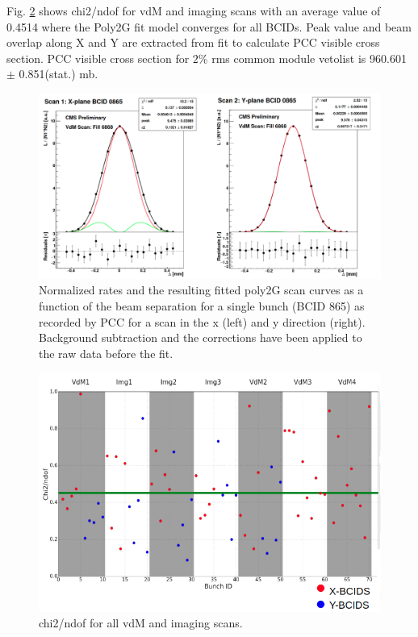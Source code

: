 Fig. \ref{fig:fitquality} shows chi2/ndof for vdM and imaging scans with an average value of 0.4514 where the Poly2G fit model converges for all BCIDs. Peak value and beam overlap along X and Y are extracted from fit to calculate PCC visible cross section. PCC visible cross section for $2\%$ rms common module vetolist is 960.601 $\pm$ 0.851(stat.) mb.

\begin{figure}[h]
    \centering
    \includegraphics[width=1\textwidth]{ashish_thesis/vdM_fit_cveto.png}
    \caption[PCC rate fit]{Normalized rates and the resulting fitted poly2G scan curves as a function of the beam separation for a single bunch (BCID 865) as recorded by PCC for a scan in the x (left) and y direction (right). Background subtraction and the corrections  have been applied to the raw data before the fit.}
    \label{fig:fitquality}
\end{figure}


\begin{figure}[h]
    \centering
    \includegraphics[width=1\textwidth]{ashish_thesis/fit_quality_chisquare.png}
    \caption[Fit quality]{chi2/ndof for all vdM and imaging scans.}
    \label{fig:fitquality}
\end{figure}


